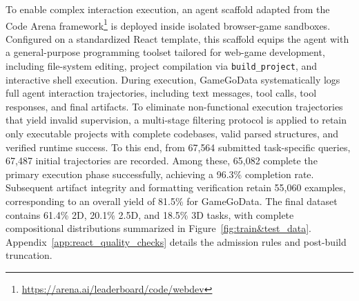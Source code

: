 \documentclass{article}
\begin{document}
To enable complex interaction execution, an agent scaffold adapted from the Code Arena framework\footnote{\url{https://arena.ai/leaderboard/code/webdev}} is deployed inside isolated browser-game sandboxes. Configured on a standardized React template, this scaffold equips the agent with a general-purpose programming toolset tailored for web-game development, including file-system editing, project compilation via \texttt{build\_project}, and interactive shell execution. During execution, GameGoData systematically logs full agent interaction trajectories, including text messages, tool calls, tool responses, and final artifacts. To eliminate non-functional execution trajectories that yield invalid supervision, a multi-stage filtering protocol is applied to retain only executable projects with complete codebases, valid parsed structures, and verified runtime success. To this end, from 67{,}564 submitted task-specific queries, 67{,}487 initial trajectories are recorded. Among these, 65{,}082 complete the primary execution phase successfully, achieving a 96.3\% completion rate. Subsequent artifact integrity and formatting verification retain 55{,}060 examples, corresponding to an overall yield of 81.5\% for GameGoData. The final dataset contains 61.4\% 2D, 20.1\% 2.5D, and 18.5\% 3D tasks, with complete compositional distributions summarized in Figure~\ref{fig:train&test_data}. Appendix~\ref{app:react_quality_checks} details the admission rules and post-build truncation.



\end{document}
